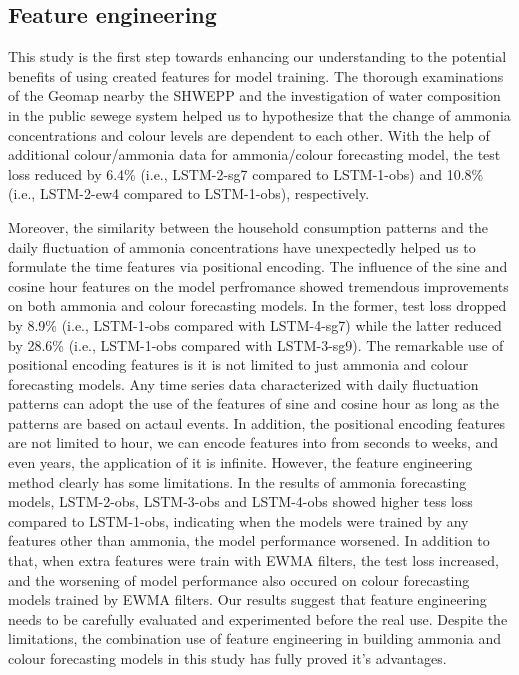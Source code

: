 \subsection{Feature engineering}
This study is the first step towards enhancing our understanding to the potential benefits of using created features for model training. The thorough examinations of the Geomap nearby the SHWEPP and the investigation of water composition in the public sewege system helped us to hypothesize that the change of ammonia concentrations and colour levels are dependent to each other. With the help of additional colour/ammonia data for ammonia/colour forecasting model, the test loss reduced by 6.4\% (i.e., LSTM-2-sg7 compared to LSTM-1-obs) and 10.8\% (i.e., LSTM-2-ew4 compared to LSTM-1-obs), respectively. 

Moreover, the similarity between the household consumption patterns and the daily fluctuation of ammonia concentrations have unexpectedly helped us to formulate the time features via positional encoding. The influence of the sine and cosine hour features on the model perfromance showed tremendous improvements on both ammonia and colour forecasting models. In the former, test loss dropped by 8.9\% (i.e., LSTM-1-obs compared with LSTM-4-sg7) while the latter reduced by 28.6\% (i.e., LSTM-1-obs compared with LSTM-3-sg9). The remarkable use of positional encoding features is it is not limited to just ammonia and colour forecasting models. Any time series data characterized with daily fluctuation patterns can adopt the use of the features of sine and cosine hour as long as the patterns are based on actaul events. In addition, the positional encoding features are not limited to hour, we can encode features into from seconds to weeks, and even years, the application of it is infinite. However, the feature engineering method clearly has some limitations. In the results of ammonia forecasting models, LSTM-2-obs, LSTM-3-obs and LSTM-4-obs showed higher tess loss compared to LSTM-1-obs, indicating when the models were trained by any features other than ammonia, the model performance worsened. In addition to that, when extra features were train with EWMA filters, the test loss increased, and the worsening of model performance also occured on colour forecasting models trained by EWMA filters. Our results suggest that feature engineering needs to be carefully evaluated and experimented before the real use. Despite the limitations, the combination use of feature engineering in building ammonia and colour forecasting models in this study has fully proved it's advantages. 


